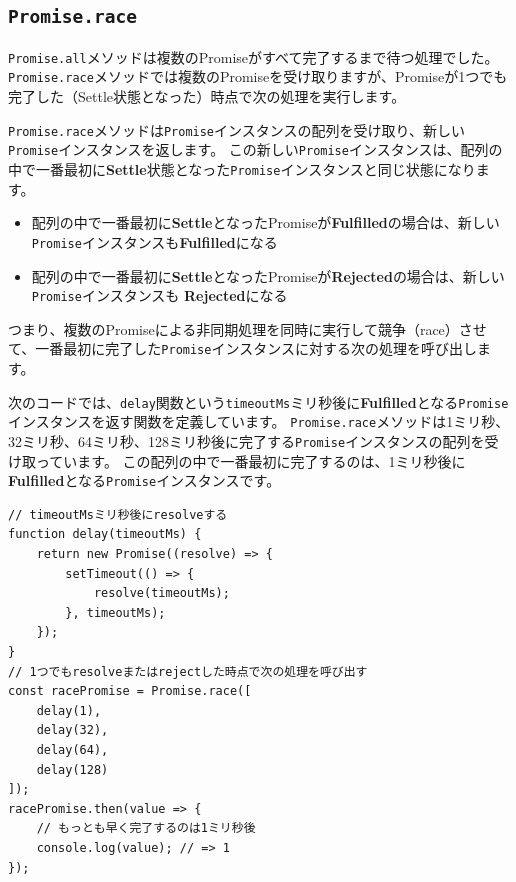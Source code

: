 \hypertarget{promise-race}{%
\subsection{\texorpdfstring{\texttt{Promise.race}}{Promise.race}}\label{promise-race}}

\texttt{Promise.all}メソッドは複数のPromiseがすべて完了するまで待つ処理でした。
\texttt{Promise.race}メソッドでは複数のPromiseを受け取りますが、Promiseが1つでも完了した（Settle状態となった）時点で次の処理を実行します。

\texttt{Promise.race}メソッドは\texttt{Promise}インスタンスの配列を受け取り、新しい\texttt{Promise}インスタンスを返します。
この新しい\texttt{Promise}インスタンスは、配列の中で一番最初に\textbf{Settle}状態となった\texttt{Promise}インスタンスと同じ状態になります。

\begin{itemize}
\item
  配列の中で一番最初に\textbf{Settle}となったPromiseが\textbf{Fulfilled}の場合は、新しい\texttt{Promise}インスタンスも\textbf{Fulfilled}になる
\item
  配列の中で一番最初に\textbf{Settle}となったPromiseが\textbf{Rejected}の場合は、新しい\texttt{Promise}インスタンスも
  \textbf{Rejected}になる
\end{itemize}

つまり、複数のPromiseによる非同期処理を同時に実行して競争（race）させて、一番最初に完了した\texttt{Promise}インスタンスに対する次の処理を呼び出します。

次のコードでは、\texttt{delay}関数という\texttt{timeoutMs}ミリ秒後に\textbf{Fulfilled}となる\texttt{Promise}インスタンスを返す関数を定義しています。
\texttt{Promise.race}メソッドは1ミリ秒、32ミリ秒、64ミリ秒、128ミリ秒後に完了する\texttt{Promise}インスタンスの配列を受け取っています。
この配列の中で一番最初に完了するのは、1ミリ秒後に\textbf{Fulfilled}となる\texttt{Promise}インスタンスです。

\begin{lstlisting}
// timeoutMsミリ秒後にresolveする
function delay(timeoutMs) {
    return new Promise((resolve) => {
        setTimeout(() => {
            resolve(timeoutMs);
        }, timeoutMs);
    });
}
// 1つでもresolveまたはrejectした時点で次の処理を呼び出す
const racePromise = Promise.race([
    delay(1),
    delay(32),
    delay(64),
    delay(128)
]);
racePromise.then(value => {
    // もっとも早く完了するのは1ミリ秒後
    console.log(value); // => 1
});
\end{lstlisting}

